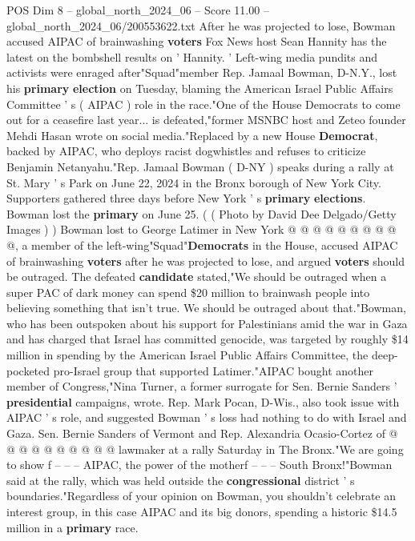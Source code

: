 \begin{textsample}{POS Dim 8 – global\_north\_2024\_06 – Score 11.00 – global\_north\_2024\_06/200553622.txt}  \label{ex:f8_pos_069}
After he was projected to lose, Bowman accused AIPAC of brainwashing \textbf{voters} Fox News host Sean Hannity has the latest on the bombshell results on ' Hannity. ' Left-wing media pundits and activists were enraged after"Squad"member Rep.
Jamaal Bowman, D-N.Y., lost his \textbf{primary} \textbf{election} on Tuesday, blaming the American Israel Public Affairs Committee ' s ( AIPAC ) role in the race."One of the House Democrats to come out for a ceasefire last year... is defeated,"former MSNBC host and Zeteo founder Mehdi Hasan wrote on social media."Replaced by a new House \textbf{Democrat}, backed by AIPAC, who deploys racist dogwhistles and refuses to criticize Benjamin Netanyahu."Rep.
Jamaal Bowman ( D-NY ) speaks during a rally at St.
Mary ' s Park on June 22, 2024 in the Bronx borough of New York City.
Supporters gathered three days before New York ' s \textbf{primary} \textbf{elections}.
Bowman lost the \textbf{primary} on June 25. ( ( Photo by David Dee Delgado/Getty Images ) ) Bowman lost to George Latimer in New York @ @ @ @ @ @ @ @ @ @, a member of the left-wing"Squad"\textbf{Democrats} in the House, accused AIPAC of brainwashing \textbf{voters} after he was projected to lose, and argued \textbf{voters} should be outraged.
The defeated \textbf{candidate} stated,"We should be outraged when a super PAC of dark money can spend \$20 million to brainwash people into believing something that isn't true.
We should be outraged about that."Bowman, who has been outspoken about his support for Palestinians amid the war in Gaza and has charged that Israel has committed genocide, was targeted by roughly \$14 million in spending by the American Israel Public Affairs Committee, the deep-pocketed pro-Israel group that supported Latimer."AIPAC bought another member of Congress,"Nina Turner, a former surrogate for Sen.
Bernie Sanders ' \textbf{presidential} campaigns, wrote.
Rep.
Mark Pocan, D-Wis., also took issue with AIPAC ' s role, and suggested Bowman ' s loss had nothing to do with Israel and Gaza.
Sen.
Bernie Sanders of Vermont and Rep.
Alexandria Ocasio-Cortez of @ @ @ @ @ @ @ @ @ @ lawmaker at a rally Saturday in The Bronx."We are going to show f -- -- -- AIPAC, the power of the motherf -- -- -- South Bronx!"Bowman said at the rally, which was held outside the \textbf{congressional} district ' s boundaries."Regardless of your opinion on Bowman, you shouldn't celebrate an interest group, in this case AIPAC and its big donors, spending a historic \$14.5 million in a \textbf{primary} race.

\end{textsample}
